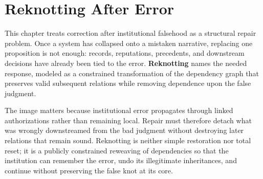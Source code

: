 
\chapter{Reknotting After Error}
\label{ch:ch082}

This chapter treats correction after institutional falsehood as a structural repair problem. Once a system has collapsed onto a mistaken narrative, replacing one proposition is not enough: records, reputations, precedents, and downstream decisions have already been tied to the error. \textbf{Reknotting} names the needed response, modeled as a constrained transformation of the dependency graph that preserves valid subsequent relations while removing dependence upon the false judgment.

The image matters because institutional error propagates through linked authorizations rather than remaining local. Repair must therefore detach what was wrongly downstreamed from the bad judgment without destroying later relations that remain sound. Reknotting is neither simple restoration nor total reset; it is a publicly constrained reweaving of dependencies so that the institution can remember the error, undo its illegitimate inheritances, and continue without preserving the false knot at its core.
